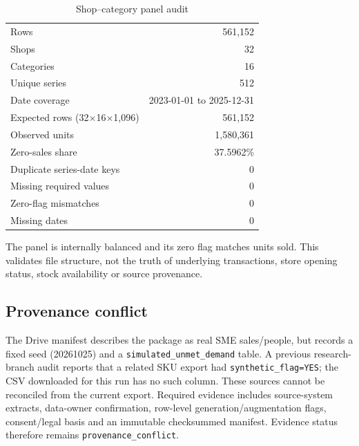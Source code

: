 \documentclass[11pt,a4paper]{article}
\begin{document}
\begin{table}[H]\centering\caption{Shop--category panel audit}\begin{tabular}{lr}\toprule
Rows & 561,152\\Shops & 32\\Categories & 16\\Unique series & 512\\Date coverage & 2023-01-01 to 2025-12-31\\Expected rows (32$\times$16$\times$1,096) & 561,152\\Observed units & 1,580,361\\Zero-sales share & 37.5962\%\\Duplicate series-date keys & 0\\Missing required values & 0\\Zero-flag mismatches & 0\\Missing dates & 0\\\bottomrule\end{tabular}\end{table}
The panel is internally balanced and its zero flag matches units sold. This validates file structure, not the truth of underlying transactions, store opening status, stock availability or source provenance.

\subsection{Provenance conflict}
The Drive manifest describes the package as real SME sales/people, but records a fixed seed (20261025) and a \texttt{simulated\_unmet\_demand} table. A previous research-branch audit reports that a related SKU export had \texttt{synthetic\_flag=YES}; the CSV downloaded for this run has no such column. These sources cannot be reconciled from the current export. Required evidence includes source-system extracts, data-owner confirmation, row-level generation/augmentation flags, consent/legal basis and an immutable checksummed manifest. Evidence status therefore remains \texttt{provenance\_conflict}.
\end{document}

